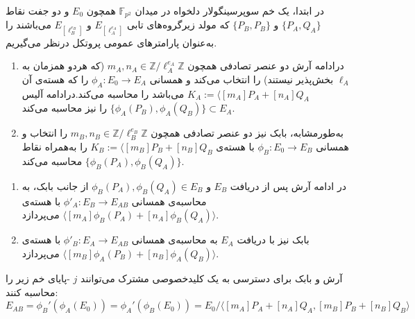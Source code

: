 \begin{enumerate}
\item{
	در ابتدا، یک خم سوپرسینگولار دلخواه در میدان
	$\mathbb{F}_{p^2}$
	همچون
	$E_0$ 
	و دو جفت نقاط 
	$\{P_A,Q_A\}$
	و
	$\{P_B,P_B\}$
	که مولد زیرگروه‌های تابی
	$E_[\ell_A^{e_A}]$
	و
	$E_[\ell_B^{e_B}]$
	می‌باشند را به‌عنوان پارامترهای عمومی پروتکل درنظر می‌گیریم.
	
}
\item{
\begin{enumerate}
\item{
درادامه آرش دو عنصر تصادفی همچون
$m_A,n_A \in \mathbb{Z}/ \ell_A^{e_A} \mathbb{Z}$
(که هردو همزمان به 
$\ell_A$
بخش‌پذیر نیستند) را انتخاب می‌کند و همسانی
$\phi_{A} : E_0 \rightarrow E_A$
را که هسته‌ی آن
$K_A := \langle [m_A]P_A + [n_A]Q_A$
می‌باشد را محاسبه می‌کند.درادامه آلیس 
$\{ \phi_A(P_B) , \phi_A(Q_B) \} \subset E_A$
را نیز محاسبه می‌کند.
}
\item{
به‌طورمشابه، بابک نیز دو عنصر تصادفی همچون
$m_B,n_B \in \mathbb{Z}/ \ell_B^{e_B} \mathbb{Z}$
را انتخاب و همسانی
$\phi_{B} : E_0 \rightarrow E_B$
با هسته‌ی
$K_B := \langle [m_B]P_B + [n_B]Q_B$
را به‌همراه نقاط
$\{ \phi_B(P_A) , \phi_B(Q_A) \}$
محاسبه می‌کند.

}
\end{enumerate}

\item {
\begin{enumerate}
\item{
در ادامه آرش پس از دریافت 
$E_B$
و
$\phi_B(P_A) , \phi_B(Q_A) \in E_B$
از جانب بابک، به محاسبه‌ی همسانی
${\phi}'_A : E_B \rightarrow E_{AB}$
با هسته‌ی
$\langle [m_A]\phi_{B}(P_A) + [n_A]\phi_{B}(Q_A) \rangle$
می‌پردازد.

}
\item{
  بابک نیز با دریافت
$E_A$
 به محاسبه‌ی همسانی
${\phi}'_B : E_A \rightarrow E_{AB}$
با هسته‌ی
$\langle [m_B]\phi_{A}(P_B) + [n_B]\phi_{A}(Q_B) \rangle$
می‌پردازد.
}
\end{enumerate}
}

}

\item{
آرش و بابک برای دسترسی به یک کلیدخصوصی مشترک می‌توانند
$j$
-پایای خم زیر را محاسبه کنند:
$$
E_{AB} = {\phi}_B'(\phi_A(E_0)) = {\phi}_A'(\phi_B(E_0)) = 
E_0 / \langle [m_A]P_A + [n_A]Q_A , [m_B]P_B + [n_B]Q_B  \rangle
$$

}
\end{enumerate}





